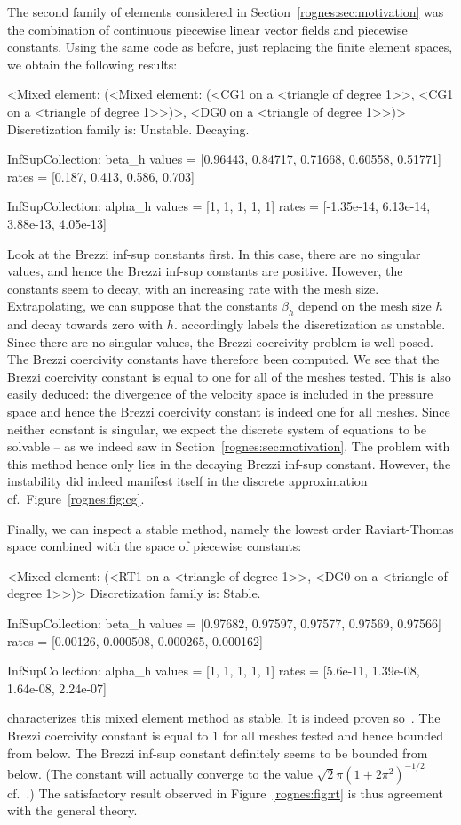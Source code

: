 The second family of elements considered in
Section~\ref{rognes:sec:motivation} was the combination of continuous
piecewise linear vector fields and piecewise constants. Using the same
code as before, just replacing the finite element spaces, we obtain
the following results:
\begin{python}
<Mixed element: (<Mixed element: (<CG1 on a <triangle of degree 1>>,
<CG1 on a <triangle of degree 1>>)>, <DG0 on a <triangle of degree 1>>)>
Discretization family is: Unstable. Decaying.

InfSupCollection: beta_h
values =         [0.96443, 0.84717, 0.71668, 0.60558, 0.51771]
rates  =         [0.187, 0.413, 0.586, 0.703]

InfSupCollection: alpha_h
values =         [1, 1, 1, 1, 1]
rates  =         [-1.35e-14, 6.13e-14, 3.88e-13, 4.05e-13]
\end{python}
Look at the Brezzi inf-sup constants first. In this case, there are no
singular values, and hence the Brezzi inf-sup constants are
positive. However, the constants seem to decay, with an increasing
rate with the mesh size. Extrapolating, we can suppose that the
constants $\beta_h$ depend on the mesh size $h$ and decay towards zero
with $h$. \ascot{} accordingly labels the discretization as
unstable. Since there are no singular values, the Brezzi coercivity
problem is well-posed. The Brezzi coercivity constants have therefore
been computed. We see that the Brezzi coercivity constant is equal to
one for all of the meshes tested. This is also easily deduced: the
divergence of the velocity space is included in the pressure space and
hence the Brezzi coercivity constant is indeed one for all
meshes. Since neither constant is singular, we expect the discrete
system of equations to be solvable -- as we indeed saw in
Section~\ref{rognes:sec:motivation}. The problem with this method hence only
lies in the decaying Brezzi inf-sup constant. However, the instability
did indeed manifest itself in the discrete approximation
cf.~Figure~\ref{rognes:fig:cg}.

Finally, we can inspect a stable method, namely the lowest order
Raviart-Thomas space combined with the space of piecewise constants:
\begin{python}
<Mixed element: (<RT1 on a <triangle of degree 1>>,
<DG0 on a <triangle of degree 1>>)>
Discretization family is: Stable.

InfSupCollection: beta_h
values =         [0.97682, 0.97597, 0.97577, 0.97569, 0.97566]
rates  =         [0.00126, 0.000508, 0.000265, 0.000162]

InfSupCollection: alpha_h
values =         [1, 1, 1, 1, 1]
rates  =         [5.6e-11, 1.39e-08, 1.64e-08, 2.24e-07]
\end{python}
\ascot{} characterizes this mixed element method as stable. It is
indeed proven so~\cite{RaviartThomas1977}. The Brezzi coercivity
constant is equal to $1$ for all meshes tested and hence bounded from
below. The Brezzi inf-sup constant definitely seems to be bounded from
below. (The constant will actually converge to the value $\sqrt{2} \pi
(1 + 2 \pi^2)^{-1/2}$ cf.~\cite{ArnoldRognes2009}.)
The satisfactory result observed in Figure~\ref{rognes:fig:rt} is thus
agreement with the general theory.


